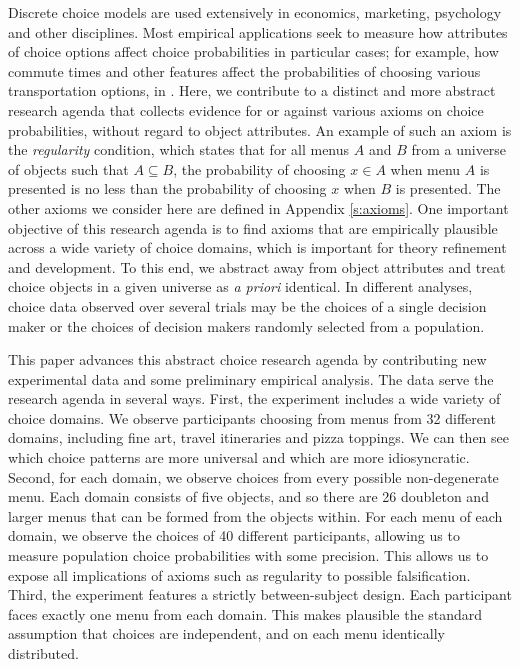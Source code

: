 \documentclass[11pt,letter]{article}
\newcommand{\menu}{menu}
\newcommand{\menus}{menus}
\begin{document}
Discrete choice models are used extensively in economics, marketing, psychology and other disciplines.
Most empirical applications seek to measure how attributes of choice options affect choice probabilities in particular cases; for example, how commute times and other features affect the probabilities of choosing various transportation options, in .
Here, we contribute to a distinct and more abstract research agenda that collects evidence for or against various axioms on choice probabilities, without regard to object attributes.
An example of such an axiom is the {\em regularity} condition, which states that for all \menus{} $A$ and $B$ from a universe of objects such that $A \subseteq B$, the probability of choosing $x \in A$ when \menu{} $A$ is presented is no less than the probability of choosing $x$ when $B$ is presented.
The other axioms we consider here are defined in Appendix \ref{s:axioms}.
One important objective of this research agenda is to find axioms that are empirically plausible across a wide variety of choice domains, which is important for theory refinement and development.
To this end, we abstract away from object attributes and treat choice objects in a given universe as {\em a priori} identical.
In different analyses, choice data observed over several trials may be the choices of a single decision maker or the choices of decision makers randomly selected from a population.

This paper advances this abstract choice research agenda by contributing new experimental data and some preliminary empirical analysis.
The data serve the research agenda in several ways.
First, the experiment includes a wide variety of choice domains.
We observe participants choosing from \menus{} from 32 different domains, including fine art, travel itineraries and pizza toppings.
We can then see which choice patterns are more universal and which are more idiosyncratic.
Second, for each domain, we observe choices from every possible non-degenerate \menu{}.
Each domain consists of five objects, and so there are 26 doubleton and larger \menus{} that can be formed from the objects within.
For each \menu{} of each domain, we observe the choices of 40 different participants, allowing us to measure population choice probabilities with some precision.
This allows us to expose all implications of axioms such as regularity to possible falsification.
Third, the experiment features a strictly between-subject design.
Each participant faces exactly one \menu{} from each domain.
This makes plausible the standard assumption that choices are independent, and on each \menu{} identically distributed.
\end{document}
